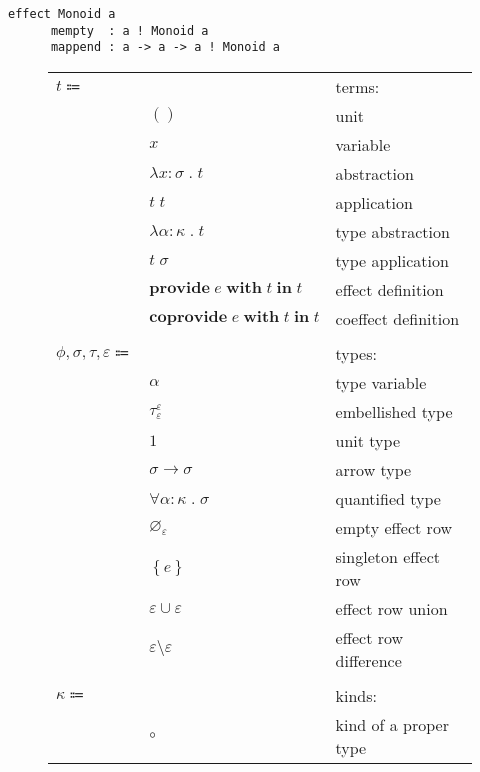 \documentclass[12pt]{article}
\newcommand\anno[2]{#1 : #2}
\newcommand\term{t}
\newcommand\eunit{()}
\newcommand\evar{x}
\newcommand\eabs[2]{\lambda #1 \; . \; #2}
\newcommand\eapp[2]{#1 \; #2}
\newcommand\etabs[2]{\lambda #1 \; . \; #2}
\newcommand\etapp[2]{#1 \; #2}
\newcommand\eprovide[3]{\textbf{provide} \; #1 \; \textbf{with} \; #2 \; \textbf{in} \; #3}
\newcommand\ecoprovide[3]{\textbf{coprovide} \; #1 \; \textbf{with} \; #2 \; \textbf{in} \; #3}
\newcommand\type{\phi}
\newcommand\proper{\tau}
\newcommand\row{\varepsilon}
\newcommand\embellished{\sigma}
\newcommand\tvar{\alpha}
\newcommand\tembellished[3]{{#1}^{#2}_{#3}}
\newcommand\tunit{1}
\newcommand\tarrow[2]{#1 \rightarrow #2}
\newcommand\tforall[2]{\forall #1 \; . \; #2}
\newcommand\tempty{\varnothing_{\row}}
\newcommand\tsingleton[1]{\left\{ #1 \right\}}
\newcommand\tunion[2]{#1 \cup #2}
\newcommand\tdiff[2]{#1 \setminus #2}
\newcommand\kind{\kappa}
\newcommand\kproper{\circ}
\newcommand\effect{e}
\begin{document}
  \begin{lstlisting}[gobble=4]
    effect Monoid a
      mempty  : a ! Monoid a
      mappend : a -> a -> a ! Monoid a
  \end{lstlisting}

  \begin{figure}
    \begin{mdframed}[backgroundcolor=none]
      \begin{center}
        \begin{tabular}{l l l}
          $\term \Coloneqq $ & & terms: \\
          & $\eunit$ & unit \\
          & $\evar$ & variable \\
          & $\eabs{\anno{\evar}{\embellished}}{\term}$ & abstraction \\
          & $\eapp{\term}{\term}$ & application \\
          & $\etabs{\anno{\tvar}{\kind}}{\term}$ & type abstraction \\
          & $\etapp{\term}{\embellished}$ & type application \\
          & $\eprovide{\effect}{\term}{\term}$ & effect definition \\
          & $\ecoprovide{\effect}{\term}{\term}$ & coeffect definition \\
          \\
          $\type,\embellished, \proper, \row \Coloneqq$ & & types: \\
          & $\tvar$ & type variable \\
          & $\tembellished{\proper}{\row}{\row}$ & embellished type \\
          & $\tunit$ & unit type \\
          & $\tarrow{\embellished}{\embellished}$ & arrow type \\
          & $\tforall{\anno{\tvar}{\kind}}{\embellished}$ & quantified type \\
          & $\tempty$ & empty effect row \\
          & $\tsingleton{\effect}$ & singleton effect row \\
          & $\tunion{\row}{\row}$ & effect row union \\
          & $\tdiff{\row}{\row}$ & effect row difference \\
          \\
          $\kind \Coloneqq$ & & kinds: \\
          & $\kproper$ & kind of a proper type \\

\end{tabular}
\end{center}
\end{mdframed}
\end{figure}
\end{document}
